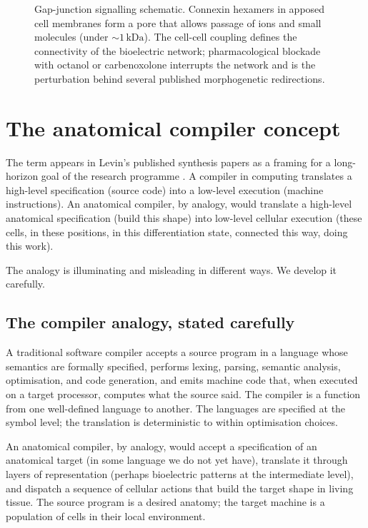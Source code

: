 \begin{figure}[ht]
  \centering
  
  \caption{Gap-junction signalling schematic. Connexin hexamers in
  apposed cell membranes form a pore that allows passage of ions and
  small molecules (under $\sim 1\,\text{kDa}$). The cell-cell coupling
  defines the connectivity of the bioelectric network; pharmacological
  blockade with octanol or carbenoxolone interrupts the network and is
  the perturbation behind several published morphogenetic
  redirections.}
  \label{fig:vol06ch13-gap-junction}
\end{figure}

\section{The anatomical compiler concept}

The term  appears in Levin's published
synthesis papers as a framing for a long-horizon goal of the research
programme \cite{paper:v6c13-levin-life-death-2021,
paper:v6c13-levin-darwin-agential-2023}. A compiler in computing
translates a high-level specification (source code) into a low-level
execution (machine instructions). An anatomical compiler, by analogy,
would translate a high-level anatomical specification (build this
shape) into low-level cellular execution (these cells, in these
positions, in this differentiation state, connected this way, doing
this work).

The analogy is illuminating and misleading in different ways. We
develop it carefully.

\subsection{The compiler analogy, stated carefully}

A traditional software compiler accepts a source program in a language
whose semantics are formally specified, performs lexing, parsing,
semantic analysis, optimisation, and code generation, and emits machine
code that, when executed on a target processor, computes what the
source said. The compiler is a function from one well-defined language
to another. The languages are specified at the symbol level; the
translation is deterministic to within optimisation choices.

An anatomical compiler, by analogy, would accept a specification of an
anatomical target (in some language we do not yet have), translate it
through layers of representation (perhaps bioelectric patterns at the
intermediate level), and dispatch a sequence of cellular actions that
build the target shape in living tissue. The source program is a
desired anatomy; the target machine is a population of cells in their
local environment.

